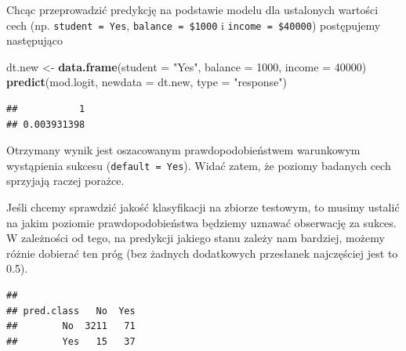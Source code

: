\documentclass[
]{book}
\newenvironment{Shaded}{\begin{snugshade}}{\end{snugshade}}
\newcommand{\AttributeTok}[1]{\textcolor[rgb]{0.13,0.29,0.53}{#1}}
\newcommand{\DecValTok}[1]{\textcolor[rgb]{0.00,0.00,0.81}{#1}}
\newcommand{\FloatTok}[1]{\textcolor[rgb]{0.00,0.00,0.81}{#1}}
\newcommand{\FunctionTok}[1]{\textcolor[rgb]{0.13,0.29,0.53}{\textbf{#1}}}
\newcommand{\NormalTok}[1]{#1}
\newcommand{\OtherTok}[1]{\textcolor[rgb]{0.56,0.35,0.01}{#1}}
\newcommand{\SpecialCharTok}[1]{\textcolor[rgb]{0.81,0.36,0.00}{\textbf{#1}}}
\newcommand{\StringTok}[1]{\textcolor[rgb]{0.31,0.60,0.02}{#1}}
\theoremstyle{plain}
\theoremstyle{definition}
\theoremstyle{definition}
\theoremstyle{definition}
\theoremstyle{definition}
\theoremstyle{definition}
\theoremstyle{remark}
\begin{document}
Chcąc przeprowadzić predykcję na podstawie modelu dla ustalonych wartości cech (np. \texttt{student\ =\ Yes}, \texttt{balance\ =\ \$1000} i \texttt{income\ =\ \$40000}) postępujemy następująco

\begin{Shaded}
\begin{Highlighting}[]
\NormalTok{dt.new }\OtherTok{\textless{}{-}} \FunctionTok{data.frame}\NormalTok{(}\AttributeTok{student =} \StringTok{"Yes"}\NormalTok{, }\AttributeTok{balance =} \DecValTok{1000}\NormalTok{, }\AttributeTok{income =} \DecValTok{40000}\NormalTok{)}
\FunctionTok{predict}\NormalTok{(mod.logit, }\AttributeTok{newdata =}\NormalTok{ dt.new, }\AttributeTok{type =} \StringTok{"response"}\NormalTok{)}
\end{Highlighting}
\end{Shaded}

\begin{verbatim}
##           1 
## 0.003931398
\end{verbatim}

Otrzymany wynik jest oszacowanym prawdopodobieństwem warunkowym wystąpienia sukcesu (\texttt{default\ =\ Yes}). Widać zatem, że poziomy badanych cech sprzyjają raczej porażce.

Jeśli chcemy sprawdzić jakość klasyfikacji na zbiorze testowym, to musimy ustalić na jakim poziomie prawdopodobieństwa będziemy uznawać obserwację za sukces. W zależności od tego, na predykcji jakiego stanu zależy nam bardziej, możemy różnie dobierać ten próg (bez żadnych dodatkowych przesłanek najczęściej jest to 0.5).

\begin{Shaded}
\end{Shaded}

\begin{verbatim}
##           
## pred.class   No  Yes
##        No  3211   71
##        Yes   15   37
\end{verbatim}
\end{document}
